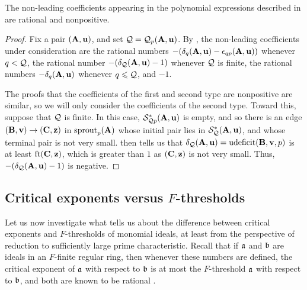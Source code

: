 \documentclass{amsart}
\begin{document}
\begin{proposition}
\label{finishing-with-the-fundamental-sequences: P}
The non-leading coefficients appearing in the polynomial expressions described in  are rational and nonpositive.
\end{proposition}

\begin{proof}
   Fix a pair $(\mathbf{A},\mathbf{u})$, and set $\mathcal{Q}=\mathcal{Q}_p(\mathbf{A},\mathbf{u})$.
   By , the non-leading coefficients under consideration are the rational numbers $-(\delta_{q}(\mathbf{A},\mathbf{u})-\epsilon_{qp}(\mathbf{A},\mathbf{u}))$ whenever $q < \mathcal{Q}$, the rational number $-(\delta_{\mathcal{Q}}(\mathbf{A},\mathbf{u}) - 1)$ whenever $\mathcal{Q}$ is finite, the rational numbers $-\delta_q(\mathbf{A},\mathbf{u})$ whenever $q\leqslant \mathcal{Q}$, and $-1$.

   The proofs that the coefficients of the first and second type are nonpositive are similar, so we will only consider the coefficients of the second type.
   Toward this, suppose that $\mathcal{Q}$ is finite.
   In this case, $\mathcal{S}^{\ast}_{\mathcal{Q} p}(\mathbf{A},\mathbf{u})$ is empty, and so there is an edge $(\mathbf{B},\mathbf{v}) \to (\mathbf{C},\mathbf{z})$ in $\operatorname{sprout}_p(\mathbf{A})$ whose initial pair lies in $\mathcal{S}^{\ast}_{\mathcal{Q}}(\mathbf{A},\mathbf{u})$, and whose terminal pair is not very small.  then tells us that $\delta_{\mathcal{Q}}(\mathbf{A},\mathbf{u}) = \operatorname{udeficit}(\mathbf{B},\mathbf{v},p)$ is at least $\operatorname{ft}(\mathbf{C}, \mathbf{z})$, which is greater than $1$ as $(\mathbf{C},\mathbf{z})$ is not very small.
   Thus, $-(\delta_{\mathcal{Q}}(\mathbf{A},\mathbf{u})-1)$ is negative.
\end{proof}

\subsection{Critical exponents versus $F$-thresholds}
\label{crit versus ft: SS}

Let us now investigate what  tells us about the difference between critical exponents and $F$-thresholds of monomial ideals, at least from the perspective of reduction to sufficiently large prime characteristic.
Recall that if $\mathfrak{a}$ and $\mathfrak{b}$ are ideals in an $F$-finite regular ring, then whenever these numbers are defined, the critical exponent of $\mathfrak{a}$ with respect to $\mathfrak{b}$ is at most the $F$-threshold $\mathfrak{a}$ with respect to $\mathfrak{b}$, and both are known to be rational \cite[Corollary~5.8]{hernandez+etal.frobenius_powers}.
\end{document}
